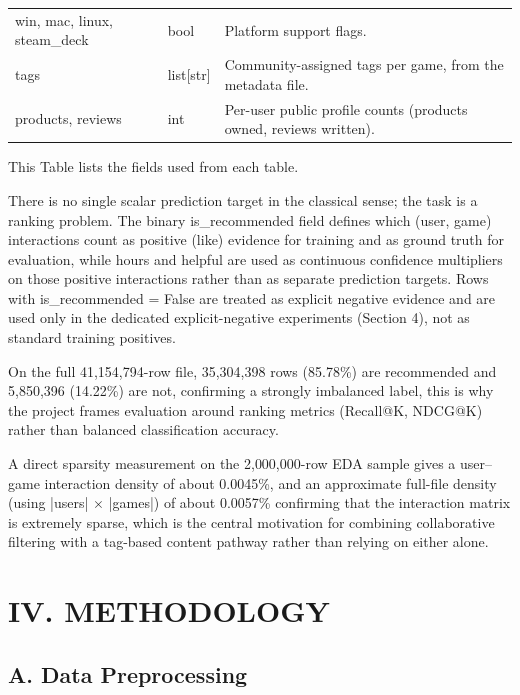 \documentclass[conference]{IEEEtran}
\begin{document}
\begin{table}[H]
{\begin{tabular}{@{}lll@{}}
win, mac, linux, steam\_deck & bool & Platform support flags. \\

tags & list[str] & Community-assigned tags per game, from the metadata file. \\

products, reviews & int & Per-user public profile counts (products owned, reviews written). \\

\bottomrule

\end{tabular}%
}

\end{table}

This Table lists the fields used from each table.

There is no single scalar prediction target in the classical sense; the task is a ranking problem. The binary is\_recommended field defines which (user, game) interactions count as positive (like) evidence for training and as ground truth for evaluation, while hours and helpful are used as continuous confidence multipliers on those positive interactions rather than as separate prediction targets. Rows with is\_recommended = False are treated as explicit negative evidence and are used only in the dedicated explicit-negative experiments (Section 4), not as standard training positives.

On the full 41,154,794-row file, 35,304,398 rows (85.78\%) are recommended and 5,850,396 (14.22\%) are not, confirming a strongly imbalanced label, this is why the project frames evaluation around ranking metrics (Recall@K, NDCG@K) rather than balanced classification accuracy.

A direct sparsity measurement on the 2,000,000-row EDA sample gives a user--game interaction density of about 0.0045\%, and an approximate full-file density (using |users| \ensuremath{\times} |games|) of about 0.0057\% confirming that the interaction matrix is extremely sparse, which is the central motivation for combining collaborative filtering with a tag-based content pathway rather than relying on either alone.

\section*{IV. METHODOLOGY}

\subsection*{A. Data Preprocessing}
\end{document}
